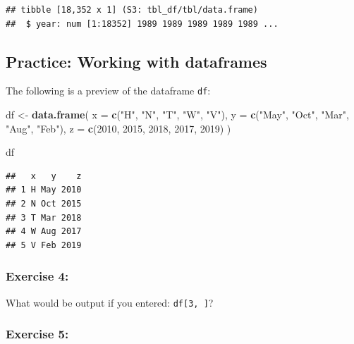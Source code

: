 \documentclass[
  10pt,
  letterpaper,
  twoside,
  openright]{book}
\newenvironment{Shaded}{\begin{snugshade}}{\end{snugshade}}
\newcommand{\AttributeTok}[1]{\textcolor[rgb]{0.13,0.29,0.53}{#1}}
\newcommand{\DecValTok}[1]{\textcolor[rgb]{0.00,0.00,0.81}{#1}}
\newcommand{\FunctionTok}[1]{\textcolor[rgb]{0.13,0.29,0.53}{\textbf{#1}}}
\newcommand{\NormalTok}[1]{#1}
\newcommand{\OtherTok}[1]{\textcolor[rgb]{0.56,0.35,0.01}{#1}}
\newcommand{\StringTok}[1]{\textcolor[rgb]{0.31,0.60,0.02}{#1}}
\begin{document}
\begin{verbatim}
## tibble [18,352 x 1] (S3: tbl_df/tbl/data.frame)
##  $ year: num [1:18352] 1989 1989 1989 1989 1989 ...
\end{verbatim}

\hypertarget{practice-working-with-dataframes}{%
\subsection{Practice: Working with
dataframes}\label{practice-working-with-dataframes}}

The following is a preview of the dataframe \texttt{df}:

\begin{Shaded}
\begin{Highlighting}[]
\NormalTok{df }\OtherTok{\textless{}{-}} \FunctionTok{data.frame}\NormalTok{(}
  \AttributeTok{x =} \FunctionTok{c}\NormalTok{(}\StringTok{"H"}\NormalTok{, }\StringTok{"N"}\NormalTok{, }\StringTok{"T"}\NormalTok{, }\StringTok{"W"}\NormalTok{, }\StringTok{"V"}\NormalTok{), }
  \AttributeTok{y =} \FunctionTok{c}\NormalTok{(}\StringTok{"May"}\NormalTok{, }\StringTok{"Oct"}\NormalTok{, }\StringTok{"Mar"}\NormalTok{, }\StringTok{"Aug"}\NormalTok{, }\StringTok{"Feb"}\NormalTok{),}
  \AttributeTok{z =} \FunctionTok{c}\NormalTok{(}\DecValTok{2010}\NormalTok{, }\DecValTok{2015}\NormalTok{, }\DecValTok{2018}\NormalTok{, }\DecValTok{2017}\NormalTok{, }\DecValTok{2019}\NormalTok{)}
\NormalTok{  )}

\NormalTok{df}
\end{Highlighting}
\end{Shaded}

\begin{verbatim}
##   x   y    z
## 1 H May 2010
## 2 N Oct 2015
## 3 T Mar 2018
## 4 W Aug 2017
## 5 V Feb 2019
\end{verbatim}

\hypertarget{exercise-4}{%
\subsubsection{Exercise 4:}\label{exercise-4}}

What would be output if you entered: \texttt{df{[}3,\ {]}}?

\hypertarget{exercise-5}{%
\subsubsection{Exercise 5:}\label{exercise-5}}
\end{document}
